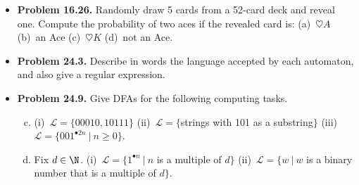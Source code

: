 \documentclass[11pt]{article}
\begin{document}
\begin{itemize}
\vspace{0.2in}

%

\item \textbf{Problem 16.26.}
Randomly draw 5 cards from a 52-card deck and reveal one.
Compute the probability of two aces if the revealed card is:
(a)~$\heartsuit A$
(b)~an Ace
(c)~$\heartsuit K$
(d)~not an Ace.

\vspace{0.2in}


\vspace{0.2in}

\item \textbf{Problem 24.3.}
Describe in words the language accepted by each automaton, and also give a regular expression.
\begin{center}
\end{center}

\vspace{0.2in}

\item \textbf{Problem 24.9.}
Give DFAs for the following computing tasks.
\begin{enumerate}[(a)]
\setcounter{enumi}{2}
\item (i)~$\mathcal{L}=\{00010,10111\}$
  (ii)~$\mathcal{L}=\{$strings with 101 as a substring$\}$
  (iii)~$\mathcal{L}=\{001^{\bullet 2n}\ |\ n\ge0\}$.
\item Fix $d\in\N$.
  (i)~$\mathcal{L}=\{1^{\bullet n}\ |\ n$ is a multiple of $d\}$
  (ii)~$\mathcal{L}=\{w\ |\ w$ is a binary number that is a multiple of $d\}$.
\end{enumerate}


\end{itemize}
\end{document}
